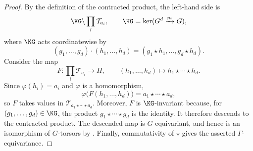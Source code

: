 \begin{proof}
By the definition of the contracted product, the left-hand side is
\[
    \KG\backslash\prod_i\mathcal T_{a_i},
    \qquad \KG=\ker(G^d\xrightarrow{m}G),
\]
where $\KG$ acts coordinatewise by
\[
    (g_1,\dots,g_d)\cdot(h_1,\dots,h_d)
      =(g_1\star h_1,\dots,g_d\star h_d).
\]
Consider the map
\[
    F:\prod_i\mathcal T_{a_i}\longrightarrow H,
    \qquad
    (h_1,\dots,h_d)\longmapsto h_1\star\cdots\star h_d.
\]
Since $\varphi(h_i)=a_i$ and $\varphi$ is a homomorphism,
\[
    \varphi\bigl(F(h_1,\dots,h_d)\bigr)
       =a_1\star\cdots\star a_d,
\]
so $F$ takes values in $\mathcal T_{a_1\star\cdots\star a_d}$. Moreover,
$F$ is $\KG$-invariant because, for $(g_1,\dots,g_d)\in\KG$, the product
$g_1\star\cdots\star g_d$ is the identity. It therefore descends to the
contracted product. The descended map is $G$-equivariant, and hence is an
isomorphism of $G$-torsors by . Finally,
commutativity of $\star$ gives the asserted $\Gamma$-equivariance.
\end{proof}
